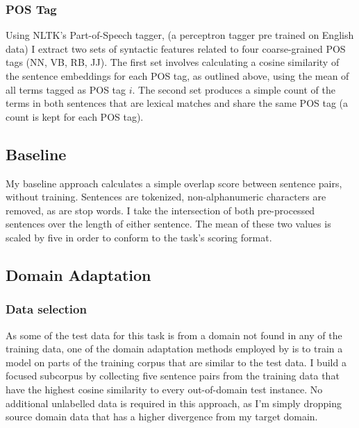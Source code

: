 \documentclass[11pt]{article}
\begin{document}
\subsubsection{POS Tag}
Using NLTK's Part-of-Speech tagger, (a perceptron tagger pre trained on English data) I extract two sets of syntactic features related to four coarse-grained POS tags (NN, VB, RB, JJ). The first set involves calculating a cosine similarity of the sentence embeddings for each POS tag, as outlined above, using the mean of all terms tagged as POS tag $i$. The second set produces a simple count of the terms in both sentences that are lexical matches and share the same POS tag (a count is kept for each POS tag).  \\
\subsection{Baseline}
My baseline approach calculates a simple overlap score between sentence pairs, without training. Sentences are tokenized, non-alphanumeric characters are removed, as are stop words. I take the intersection of both pre-processed sentences over the length of either sentence. The mean of these two values is scaled by five in order to conform to the task's scoring format. \\
\subsection{Domain Adaptation}

\subsubsection{Data selection}
As some of the test data for this task is from a domain not found in any of the training data, one of the domain adaptation methods employed by \cite{arora2015dcu} is to train a model on parts of the training corpus that are similar to the test data. I build a focused subcorpus by collecting five sentence pairs from the training data that have the highest cosine similarity to every out-of-domain test instance. No additional unlabelled data is required in this approach, as I'm simply dropping source domain data that has a higher divergence from my target domain. \\
\end{document}
